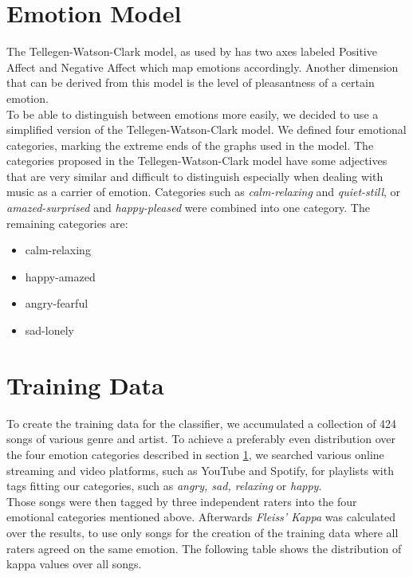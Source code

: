 \documentclass{sigchi-ext}
\begin{document}
\section{Emotion Model}\label{sec:emotion-model}
The Tellegen-Watson-Clark model, as used by \cite{Trohidis2011} has two axes labeled Positive Affect and Negative Affect which map emotions accordingly. Another dimension that can be derived from this model is the level of pleasantness of a certain emotion.\\
To be able to distinguish between emotions more easily, we decided to use a simplified version of the Tellegen-Watson-Clark model. We defined four emotional categories, marking the extreme ends of the graphs used in the model. The categories proposed in the Tellegen-Watson-Clark model have some adjectives that are very similar and difficult to distinguish especially when dealing with music as a carrier of emotion. Categories such as \textit{calm-relaxing} and \textit{quiet-still}, or \textit{amazed-surprised} and \textit{happy-pleased} were combined into one category. The remaining categories are:

\begin{itemize}
	\item calm-relaxing
	\item happy-amazed
	\item angry-fearful
	\item sad-lonely
\end{itemize}

\section{Training Data}\label{training-data}
To create the training data for the classifier, we accumulated a collection of 424 songs of various genre and artist. To achieve a preferably even distribution over the four emotion categories described in section \ref{sec:emotion-model}, we searched various online streaming and video platforms, such as YouTube and Spotify, for playlists with tags fitting our categories, such as \textit{angry, sad, relaxing} or \textit{happy}.\\
Those songs were then tagged by three independent raters into the four emotional categories mentioned above. Afterwards \textit{Fleiss' Kappa} was calculated over the results, to use only songs for the creation of the training data where all raters agreed on the same emotion. The following table shows the distribution of kappa values over all songs.\\
\end{document}
